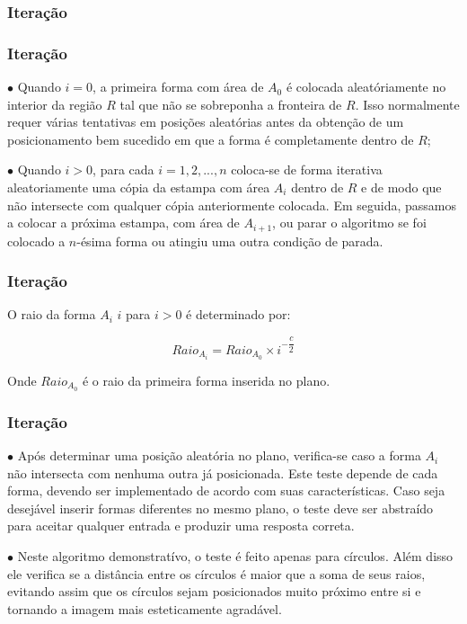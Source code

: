 \documentclass[aspectratio=169,11pt,red]{beamer}
\begin{document}
\subsubsection{Iteração}
\begin{frame}
\frametitle{Iteração}

$\bullet$ Quando $i = 0$, a primeira forma com área de $A_{0}$ é colocada aleatóriamente no interior da região $R$ tal que não se sobreponha a fronteira de $R$. Isso normalmente requer várias tentativas em posições aleatórias antes da obtenção de um posicionamento bem sucedido em que a forma é completamente dentro de $R$;
\medskip
\pause

$\bullet$ Quando $i > 0$, para cada $i = 1, 2, ..., n$ coloca-se de forma iterativa aleatoriamente uma cópia da estampa com área $A_{i}$ dentro de $R$ e de modo que não intersecte com qualquer cópia anteriormente colocada. Em seguida, passamos a colocar a próxima estampa, com área de $A_{i + 1}$, ou parar o algoritmo se foi colocado a $n$-ésima forma ou atingiu uma outra condição de parada.
\medskip

\end{frame}

\begin{frame}
\frametitle{Iteração}

O raio da forma $A_{i}$ $i$ para $i > 0$ é determinado por:
\medskip

\begin{equation}
Raio_{A_{i}}= Raio_{A_{0}} \times i^{-\dfrac{c}{2}} 
\end{equation}
\medskip

Onde $Raio_{A_{0}}$ é o raio da primeira forma inserida no plano.
\medskip

\end{frame}

\begin{frame}
\frametitle{Iteração}

$\bullet$ Após determinar uma posição aleatória no plano, verifica-se caso a forma $A_{i}$ não intersecta com nenhuma outra já posicionada. Este teste depende de cada forma, devendo ser implementado de acordo com suas características. Caso seja desejável inserir formas diferentes no mesmo plano, o teste deve ser abstraído para aceitar qualquer entrada e produzir uma resposta correta.
\medskip
\pause

$\bullet$ Neste algoritmo demonstratívo, o teste é feito apenas para círculos. Além disso ele verifica se a distância entre os círculos é maior que a soma de seus raios, evitando assim que os círculos sejam posicionados muito próximo entre si e tornando a imagem mais esteticamente agradável.
\medskip

\end{frame}
\end{document}
